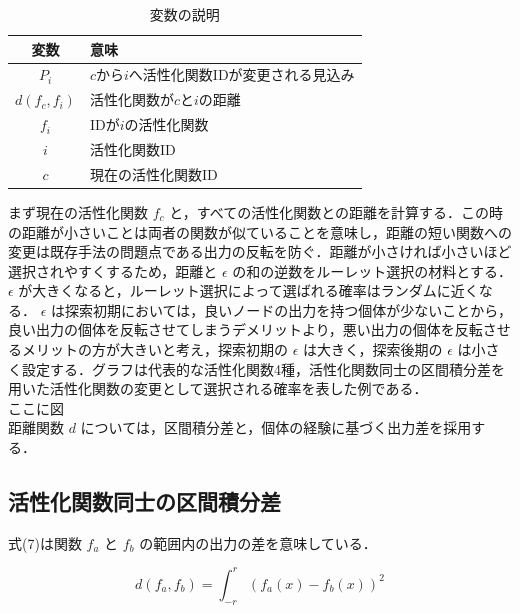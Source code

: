 \begin{table}[h]
    \caption{変数の説明}
    \centering
    \begin{tabular}{cl}
        \hline
        変数  & 意味 \\
        \hline \hline
        $P_{i}$               & $c$から$i$へ活性化関数IDが変更される見込み \\
        $d(f_{c}, f_{i})$     & 活性化関数が$c$と$i$の距離                 \\
        $f_{i}$               & IDが$i$の活性化関数                        \\
        $i$                   & 活性化関数ID                               \\
        $c$                   & 現在の活性化関数ID                         \\
        \hline
    \end{tabular}
\end{table}

まず現在の活性化関数 $ f_c $ と，すべての活性化関数との距離を計算する．この時の距離が小さいことは両者の関数が似ていることを意味し，距離の短い関数への変更は既存手法の問題点である出力の反転を防ぐ．距離が小さければ小さいほど選択されやすくするため，距離と $ \epsilon $ の和の逆数をルーレット選択の材料とする． $ \epsilon $ が大きくなると，ルーレット選択によって選ばれる確率はランダムに近くなる． $ \epsilon $ は探索初期においては，良いノードの出力を持つ個体が少ないことから，良い出力の個体を反転させてしまうデメリットより，悪い出力の個体を反転させるメリットの方が大きいと考え，探索初期の $ \epsilon $ は大きく，探索後期の $ \epsilon $ は小さく設定する．グラフは代表的な活性化関数4種，活性化関数同士の区間積分差を用いた活性化関数の変更として選択される確率を表した例である．\\

ここに図 \\

距離関数 $ d $ については，区間積分差と，個体の経験に基づく出力差を採用する．

\subsection{活性化関数同士の区間積分差}
式(7)は関数 $ f_a $ と $ f_b $ の範囲内の出力の差を意味している．

\begin{equation}
    d(f_{a}, f_{b}) = \int^{r}_{-r} (f_{a}(x) - f_{b}(x))^{2}
\end{equation}

